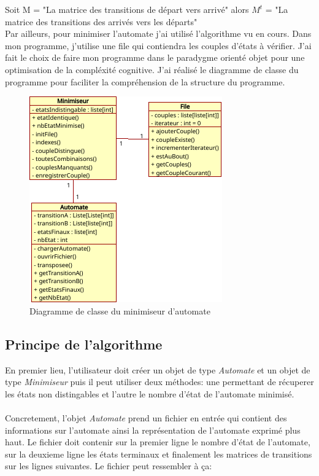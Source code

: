 \documentclass[a4paper]{article}
\begin{document}
Soit M = "La matrice des transitions de départ vers arrivé"
alors $M^t$ = "La matrice des transitions des arrivés vers les départs"\\

Par ailleurs, pour minimiser l'automate j'ai utilisé l'algorithme vu
en cours. Dans mon programme, j'utilise une file qui contiendra les
couples d'états à vérifier. J'ai fait le choix de faire mon programme
dans le paradygme orienté objet pour une optimisation de la compléxité cognitive.
J'ai réalisé le diagramme de classe du programme pour faciliter
la compréhension de la structure du programme.

\begin{figure}[!h]
	\centering
	\includegraphics[scale=0.8]{src/diagramme_minimiseur.png}
	\caption{Diagramme de classe du minimiseur d'automate}
\end{figure}


\subsection{Principe de l'algorithme}

En premier lieu, l'utilisateur doit créer un objet de type \textit{Automate} et 
un objet de type \textit{Minimiseur} puis il peut utiliser deux méthodes:
une permettant de récuperer les états non distingables et l'autre le nombre
d'état de l'automate minimisé.\\

\fbox{
	
}\\

Concretement, l'objet \textit{Automate} prend un fichier en entrée qui contient des informations sur
l'automate ainsi la représentation de l'automate exprimé plus haut. Le fichier 
doit contenir sur la premier ligne le nombre d'état de l'automate, sur la deuxieme
ligne les états terminaux et finalement les matrices de transitions sur les lignes suivantes.
Le fichier peut ressembler à ça:\\
\end{document}
